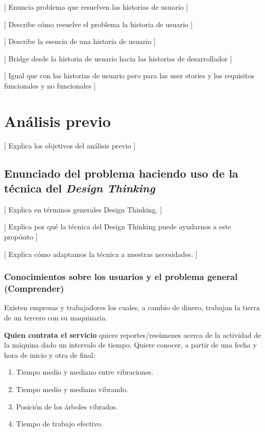 [ Enuncia problema que resuelven las historias de usuario ]

[ Describe cómo resuelve el problema la historia de usuario ]

[ Describe la esencia de una historia de usuario ]

[ Bridge desde la historia de usuario hacia las historias de desarrollador ]

[ Igual que con las historias de usuario pero para las user stories y
los requisitos funcionales y no funcionales ]

\section{Análisis previo}

[ Explica los objetivos del análisis previo ]

\subsection{Enunciado del problema haciendo uso de la técnica del \textit{Design Thinking}}

[ Explica en términos generales Design Thinking. ]

[ Explica por qué la técnica del Design Thinking puede ayudarnos a este propósito ]

[ Explica cómo adaptamos la técnica a nuestras necesidades. ]

\subsubsection{Conocimientos sobre los usuarios y el problema general (Comprender)}

Existen empresas y trabajadores los cuales, a cambio de dinero, trabajan la
tierra de un tercero con su maquinaria.

\textbf{Quien contrata el servicio} quiere reportes/resúmenes acerca de la actividad
de la máquina dado un intervalo de tiempo. Quiere conocer, a partir de una fecha y hora de inicio y otra de final:

\begin{enumerate}
   \item Tiempo medio y mediano entre vibraciones.
   \item Tiempo medio y mediano vibrando.
   \item Posición de los árboles vibrados.
   \item Tiempo de trabajo efectivo.
\end{enumerate}

